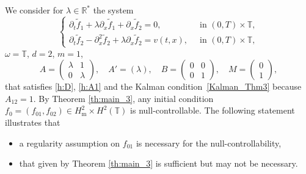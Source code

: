 \documentclass[JEP,XML,SOM,Unicode,NoEqCountersInSection]{cedram}
\theoremstyle{plain}
\theoremstyle{definition}
\theoremstyle{remark}
\newcommand{\set}{\mathbb}
\newcommand{\T}{\set{T}}
\newcommand{\m}{{\mathrm m}}
\begin{document}
We consider for $\lambda\in\mathbb{R}^*$ the system\vspace*{-3pt}
\begin{equation} \label{c-ex_parab}
\begin{cases}
\partial_t \widetilde{f}_1 + \lambda \partial_x \widetilde{f}_1 + \partial_x \widetilde{f}_2 = 0, &\ \text{ in } (0,T)\times\T, \\
\partial_t \widetilde{f}_2 - \partial_x^2 \widetilde{f}_2 + \lambda \partial_x \widetilde{f}_2 = v(t,x), &\ \text{ in } (0,T)\times\T,
\end{cases}
\end{equation}
\ie $\omega=\T$, $d=2$, $m=1$,\vspace*{-3pt}\enlargethispage{.5\baselineskip}%
\[
A=\begin{pmatrix}
\lambda & 1 \\ 0 & \lambda
\end{pmatrix},\quad
A'=(\lambda), \quad
B=\begin{pmatrix}
0 & 0 \\ 0 & 1
\end{pmatrix},\quad
M=\begin{pmatrix}
0 \\ 1
\end{pmatrix},
\]
that satisfies \eqref{h:D}, \eqref{h:A1} and the Kalman condition~\eqref{Kalman_Thm3} because $A_{12}=1$.
By Theorem \ref{th:main_3}, any initial condition $f_0=(f_{01},f_{02})\in H^{2}_\m \times H^2(\T)$ is null-controllable.
The following statement illustrates that
\begin{itemize}
\item a regularity assumption on $f_{01}$ is necessary for the null-controllability,
\item that given by Theorem \ref{th:main_3} is sufficient but may not be necessary.
\end{itemize}
\end{document}
